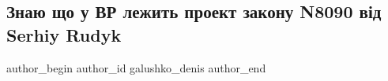  
 
 
 
 

\subsection{Знаю що у ВР лежить проект закону N8090 від Serhiy Rudyk}
\label{sec:17_10_2022.fb.galushko_denis.1.znayu_shcho_u_vr_lez}

\ifcmt
 author_begin
   author_id galushko_denis
 author_end
\fi
